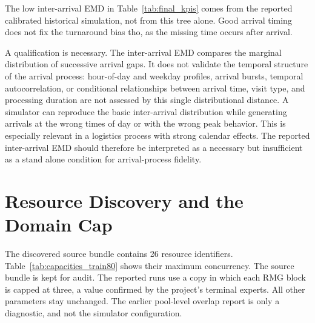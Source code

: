 The low inter-arrival EMD in Table~\ref{tab:final_kpis} comes from the reported
calibrated historical simulation, not from this tree alone. Good arrival
timing does not fix the turnaround bias tho, as the missing time occurs after arrival.

A qualification is necessary. The inter-arrival EMD compares the marginal
distribution of successive arrival gaps.  It does not validate the temporal
structure of the arrival process: hour-of-day and weekday profiles, arrival
bursts, temporal autocorrelation, or conditional relationships between arrival
time, visit type, and processing duration are not assessed by this single
distributional distance.  A simulator can reproduce the basic inter-arrival
distribution while generating arrivals at the wrong times of day or with the
wrong peak behavior.  This is especially relevant in a logistics process
with strong calendar effects.  The reported inter-arrival EMD should therefore
be interpreted as a necessary but insufficient as a stand alone condition for arrival-process
fidelity.

\section{Resource Discovery and the Domain Cap}
\label{sec:results_resource_capacities}

The discovered source bundle contains 26 resource identifiers.
Table~\ref{tab:capacities_train80} shows their maximum concurrency. The source
bundle is kept for audit. The reported runs use a copy in which each RMG block is
capped at three, a value confirmed by the project's terminal experts. All other
parameters stay unchanged. The earlier pool-level overlap report is only a
diagnostic, and not the simulator configuration.

